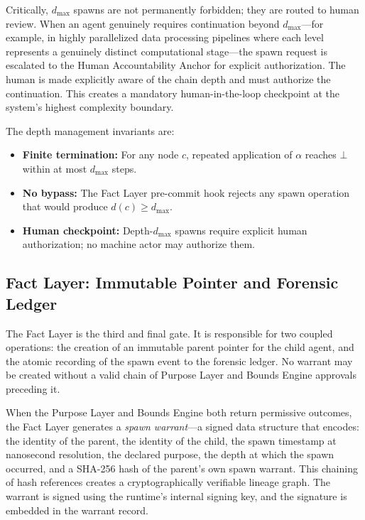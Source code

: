 Critically, $d_{\max}$ spawns are not permanently forbidden; they are routed to human review. When an agent genuinely requires continuation beyond $d_{\max}$---for example, in highly parallelized data processing pipelines where each level represents a genuinely distinct computational stage---the spawn request is escalated to the Human Accountability Anchor for explicit authorization. The human is made explicitly aware of the chain depth and must authorize the continuation. This creates a mandatory human-in-the-loop checkpoint at the system's highest complexity boundary.

The depth management invariants are:

\begin{itemize}
    \itemsep0em
    \item \textbf{Finite termination:} For any node $c$, repeated application of $\alpha$ reaches $\bot$ within at most $d_{\max}$ steps.
    \item \textbf{No bypass:} The Fact Layer pre-commit hook rejects any spawn operation that would produce $d(c) \geq d_{\max}$.
    \item \textbf{Human checkpoint:} Depth-$d_{\max}$ spawns require explicit human authorization; no machine actor may authorize them.
\end{itemize}

\subsection{Fact Layer: Immutable Pointer and Forensic Ledger}
\label{sec:rsp-fact-layer}

The Fact Layer is the third and final gate. It is responsible for two coupled operations: the creation of an immutable parent pointer for the child agent, and the atomic recording of the spawn event to the forensic ledger. No warrant may be created without a valid chain of Purpose Layer and Bounds Engine approvals preceding it.

When the Purpose Layer and Bounds Engine both return permissive outcomes, the Fact Layer generates a \textit{spawn warrant}---a signed data structure that encodes: the identity of the parent, the identity of the child, the spawn timestamp at nanosecond resolution, the declared purpose, the depth at which the spawn occurred, and a SHA-256 hash of the parent's own spawn warrant. This chaining of hash references creates a cryptographically verifiable lineage graph. The warrant is signed using the runtime's internal signing key, and the signature is embedded in the warrant record.


